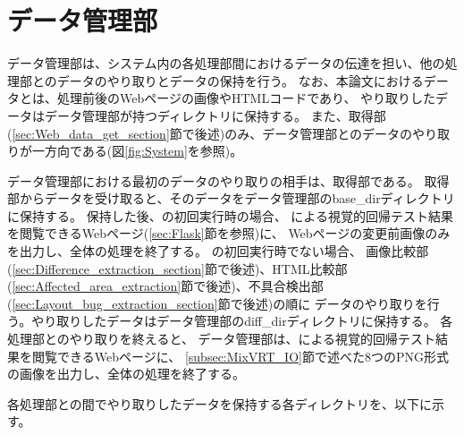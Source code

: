 \section{データ管理部}\label{sec:data_admin_section}
データ管理部は、システム内の各処理部間におけるデータの伝達を担い、他の処理部とのデータのやり取りとデータの保持を行う。
なお、本論文におけるデータとは、処理前後のWebページの画像やHTMLコードであり、
やり取りしたデータはデータ管理部が持つディレクトリに保持する。
また、取得部(\ref{sec:Web_data_get_section}節で後述)のみ、データ管理部とのデータのやり取りが一方向である(図\ref{fig:System}を参照)。
\par
データ管理部における最初のデータのやり取りの相手は、取得部である。
取得部からデータを受け取ると、そのデータをデータ管理部のbase\_dirディレクトリに保持する。
保持した後、\toolName の初回実行時の場合、
\toolName による視覚的回帰テスト結果を閲覧できるWebページ(\ref{sec:Flask}節を参照)に、
Webページの変更前画像のみを出力し、全体の処理を終了する。
\toolName の初回実行時でない場合、
画像比較部(\ref{sec:Difference_extraction_section}節で後述)、HTML比較部(\ref{sec:Affected_area_extraction}節で後述)、不具合検出部(\ref{sec:Layout_bug_extraction_section}節で後述)の順に
データのやり取りを行う。やり取りしたデータはデータ管理部のdiff\_dirディレクトリに保持する。
各処理部とのやり取りを終えると、
データ管理部は、\toolName による視覚的回帰テスト結果を閲覧できるWebページに、
\ref{subsec:MixVRT_IO}節で述べた8つのPNG形式の画像を出力し、全体の処理を終了する。
\par
各処理部との間でやり取りしたデータを保持する各ディレクトリを、以下に示す。
